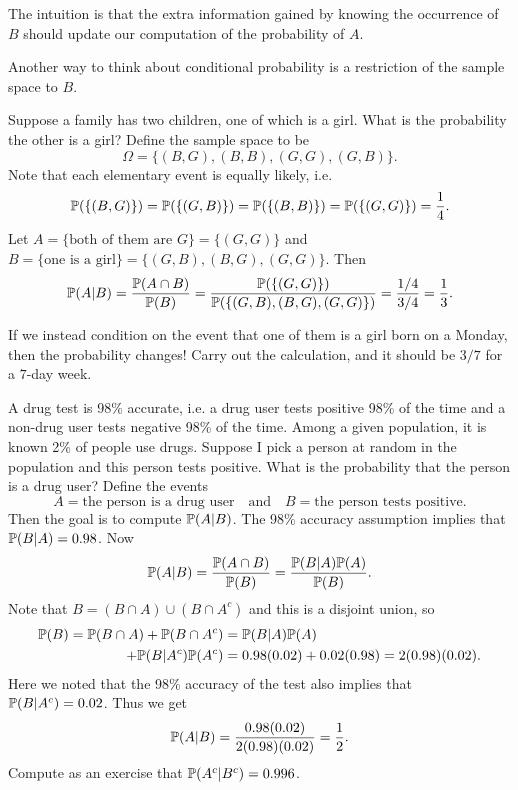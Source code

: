 \begin{remark}
  The intuition is that the extra information gained by
  knowing the occurrence of $B$ should update our
  computation of the probability of $A$.
\end{remark}

\begin{remark}
  Another way to think about conditional probability
  is a restriction of the sample space to $B$.
\end{remark}

\begin{example}
  Suppose a family has two children, one of
  which is a girl. What is the probability the other
  is a girl?
  Define the sample space to be
  \[
    \Omega = \{(B, G), (B, B), (G, G), (G, B)\}.
  \]
  Note that each elementary event is equally likely,
  i.e.
  \[
    \mathbb{P}(\{(B, G)\}) = \mathbb{P}(\{(G, B)\})
    = \mathbb{P}(\{(B, B)\}) = \mathbb{P}(\{(G, G)\}) = \frac{1}{4}.
  \]
  Let $A = \{\text{both of them are $G$}\} = \{(G, G)\}$
  and $B = \{\text{one is a girl}\} = \{(G, B), (B, G), (G, G)\}$.
  Then
  \[
    \mathbb{P}(A | B) = \frac{\mathbb{P}(A \cap B)}{\mathbb{P}(B)}
    = \frac{\mathbb{P}(\{(G, G)\})}{\mathbb{P}(\{(G, B), (B, G), (G, G)\})}
    = \frac{1/4}{3/4} = \frac{1}{3}.
  \]
\end{example}

\begin{remark}
  If we instead condition on the event that one of
  them is a girl born on a Monday, then the
  probability changes! Carry out the calculation,
  and it should be $3 / 7$ for a
  $7$-day week.
\end{remark}

\begin{example}
  A drug test is 98\% accurate, i.e.
  a drug user tests positive 98\% of the time
  and a non-drug user tests negative 98\% of the time.
  Among a given
  population, it is known 2\% of people use drugs.
  Suppose I pick a person at random in the population
  and this person tests positive. What is the
  probability that the person is a drug
  user? Define the events
  \[
    A = \text{the person is a drug user}
    \quad \text{and} \quad
    B = \text{the person tests positive}.
  \]
  Then the goal is to compute $\mathbb{P}(A | B)$. The
  98\% accuracy assumption implies that
  $\mathbb{P}(B | A) = 0.98$. Now
  \[
    \mathbb{P}(A | B) = \frac{\mathbb{P}(A \cap B)}{\mathbb{P}(B)}
    = \frac{\mathbb{P}(B | A) \mathbb{P}(A)}{\mathbb{P}(B)}.
  \]
  Note that $B = (B \cap A) \cup (B \cap A^c)$
  and this is a disjoint union, so
  \begin{align*}
    \mathbb{P}(B) = \mathbb{P}(B \cap A) + \mathbb{P}(B \cap A^c)
    &= \mathbb{P}(B | A) \mathbb{P}(A) \\
    + \mathbb{P}(B | A^c) \mathbb{P}(A^c)
    &= 0.98(0.02) + 0.02(0.98) = 2(0.98)(0.02).
  \end{align*}
  Here we noted that the 98\% accuracy of the test
  also implies that $\mathbb{P}(B | A^c) = 0.02$.
  Thus we get
  \[
    \mathbb{P}(A | B) = \frac{0.98(0.02)}{2(0.98)(0.02)}
    = \frac{1}{2}.
  \]
  Compute as an exercise that $\mathbb{P}(A^c | B^c) = 0.996$.
\end{example}


